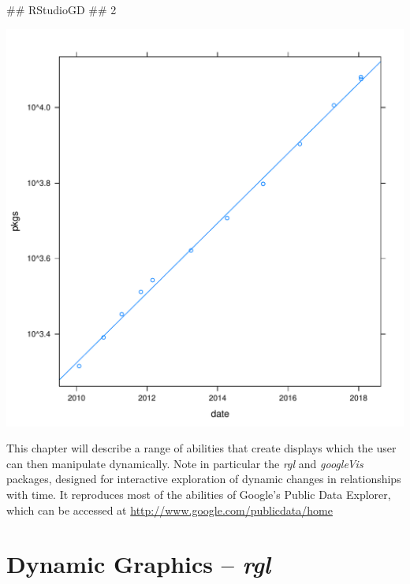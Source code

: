 

\begin{Schunk}
\begin{Soutput}
## RStudioGD 
##         2
\end{Soutput}

\includegraphics[width=\maxwidth]{figure/unnamed-chunk-2-1} \end{Schunk}

This chapter will describe a range of abilities that create displays
which the user can then manipulate dynamically.  Note in particular
the {\em rgl} and {\em googleVis} packages, designed for interactive
exploration of dynamic changes in relationships with time.  It
reproduces most of the abilities of Google's Public Data Explorer,
which can be accessed at \url{http://www.google.com/publicdata/home}

\section{Dynamic Graphics -- \textit{rgl}}\label{sec:dynamicg}



